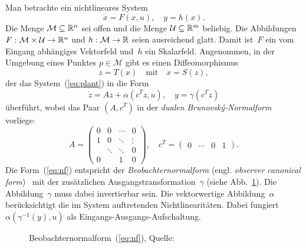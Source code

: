 Man betrachte ein nichtlineares System 
\begin{equation}
\dot{x}=F(x,u),\quad y=h(x).\label{eq:plant}
\end{equation}
Die Menge $\mathcal{M}\subseteq{\mathbb{R}}^{n}$ sei offen und die Menge $\mathcal{U}\subseteq{\mathbb{R}}^{m}$
beliebig. Die Abbildungen $F:\mathcal{M}\times\mathcal{U}\to{\mathbb{R}}^{n}$
und $h:\mathcal{M}\to{\mathbb{R}}$ seien ausreichend glatt. Damit ist~$F$
ein vom Eingang abhängiges Vektorfeld und~$h$ ein Skalarfeld. Angenommen,
in der Umgebung eines Punktes $p\in\mathcal{M}$ gibt es einen Diffeomorphismus
\begin{equation}
z=T(x)\quad\textrm{mit}\quad x=S(z),\label{eq:TS}
\end{equation}
der das System~(\ref{eq:plant}) in die Form 
\begin{equation}
\dot{z}=Az+\alpha(c^{T}z,u),\quad y=\gamma(c^{T}z)\label{eq:nf}
\end{equation}
überführt, wobei das Paar $(A,c^{T})$ in der \emph{dualen} \emph{Brunovský-Normalform}~\cite{brunovsky70}
vorliege: 
\begin{equation}
A=\left(\begin{array}{cccc}
0 & 0 & \cdots & 0\\
1 & 0 & \ddots & \vdots\\
 & \ddots & \ddots & 0\\
0 &  & 1 & 0
\end{array}\right),\quad c^{T}=\left(\begin{array}{cccc}
0 & \cdots & 0 & 1\end{array}\right).\label{eq:AC}
\end{equation}
Die Form~(\ref{eq:nf}) entspricht der \emph{Beobachter\-normal\-form}
(engl. \emph{observer canonical form})~\cite{zeitz85,zeitz89}
mit der zusätzlichen Ausgangstransformation~$\gamma$ (siehe Abb.~\ref{fig:Beobachter-Normalform}).
Die Abbildung~$\gamma$ muss dabei invertierbar sein. Die vektorwertige
Abbildung~$\alpha$ berücksichtigt die im System auftretenden Nichtlinearitäten.
Dabei fungiert $\alpha(\gamma^{-1}(y),u)$ als Eingangs-Ausgangs-Aufschaltung. 

\begin{figure}
\begin{centering}
\resizebox{0.7\textwidth}{!}{}
\par\end{centering}
\caption{Beobachternormalform~(\ref{eq:nf}), Quelle:~\cite{roebenack2010at}\label{fig:Beobachter-Normalform}}
\end{figure}

